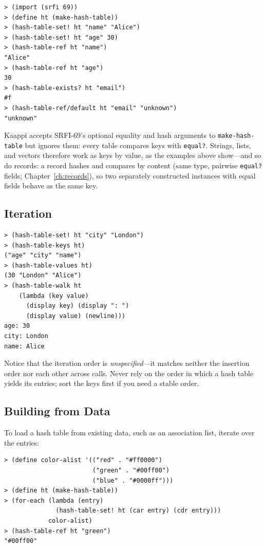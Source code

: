 \begin{lstlisting}[style=repl]
> (import (srfi 69))
> (define ht (make-hash-table))
> (hash-table-set! ht "name" "Alice")
> (hash-table-set! ht "age" 30)
> (hash-table-ref ht "name")
"Alice"
> (hash-table-ref ht "age")
30
> (hash-table-exists? ht "email")
#f
> (hash-table-ref/default ht "email" "unknown")
"unknown"
\end{lstlisting}

\begin{warning}
Kaappi accepts SRFI-69's optional equality and hash arguments to \texttt{make-hash-table} but ignores them: every table compares keys with \texttt{equal?}. Strings, lists, and vectors therefore work as keys by value, as the examples above show---and so do records: a record hashes and compares by content (same type, pairwise \texttt{equal?} fields; Chapter~\ref{ch:records}), so two separately constructed instances with equal fields behave as the same key.
\end{warning}

\subsection{Iteration}

\begin{lstlisting}[style=repl]
> (hash-table-set! ht "city" "London")
> (hash-table-keys ht)
("age" "city" "name")
> (hash-table-values ht)
(30 "London" "Alice")
> (hash-table-walk ht
    (lambda (key value)
      (display key) (display ": ")
      (display value) (newline)))
age: 30
city: London
name: Alice
\end{lstlisting}

Notice that the iteration order is \emph{unspecified}---it matches neither the insertion order nor each other across calls. Never rely on the order in which a hash table yields its entries; sort the keys first if you need a stable order.

\subsection{Building from Data}

To load a hash table from existing data, such as an association list, iterate over the entries:

\begin{lstlisting}[style=repl]
> (define color-alist '(("red" . "#ff0000")
                        ("green" . "#00ff00")
                        ("blue" . "#0000ff")))
> (define ht (make-hash-table))
> (for-each (lambda (entry)
              (hash-table-set! ht (car entry) (cdr entry)))
            color-alist)
> (hash-table-ref ht "green")
"#00ff00"
\end{lstlisting}

